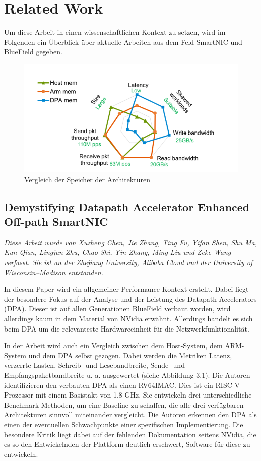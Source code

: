 \chapter{Related Work}
Um diese Arbeit in einen wissenschaftlichen Kontext zu setzen, wird im Folgenden ein Überblick über aktuelle Arbeiten aus dem Feld SmartNIC und BlueField gegeben.
\begin{figure}
    \centering
    \includegraphics[width=0.7\linewidth]{images/DPARam.png}
    \caption{Vergleich der Speicher der Architekturen \cite{chen2024demystifying}}
    \label{fig:enter-label}
\end{figure}
\section{Demystifying Datapath Accelerator Enhanced Off-path SmartNIC}
\textit{Diese Arbeit wurde von Xuzheng Chen, Jie Zhang, Ting Fu, Yifan Shen, Shu Ma, Kun Qian, Lingjun Zhu, Chao Shi, Yin Zhang, Ming Liu und Zeke Wang verfasst. Sie ist an der Zhejiang University, Alibaba Cloud und der University of Wisconsin–Madison entstanden.}

In diesem Paper wird ein allgemeiner Performance-Kontext erstellt. Dabei liegt der besondere Fokus auf der Analyse und der Leistung des Datapath Accelerators (DPA). Dieser ist auf allen Generationen BlueField verbaut worden, wird allerdings kaum in dem Material von NVidia erwähnt. Allerdings handelt es sich beim DPA um die relevanteste Hardwareeinheit für die Netzwerkfunktionalität. 

In der Arbeit wird auch ein Vergleich zwischen dem Host-System, dem ARM-System und dem DPA selbst gezogen. Dabei werden die Metriken Latenz, verzerrte Lasten, Schreib- und Lesebandbreite, Sende- und Empfangspaketbandbreite u. a. ausgewertet (siehe Abbildung 3.1). Die Autoren identifizieren den verbauten DPA als einen RV64IMAC. Dies ist ein RISC-V-Prozessor mit einem Basistakt von 1.8 GHz. Sie entwickeln drei unterschiedliche Benchmark-Methoden, um eine Baseline zu schaffen, die alle drei verfügbaren Architekturen sinnvoll miteinander vergleicht. Die Autoren erkennen den DPA als einen der eventuellen Schwachpunkte einer spezifischen Implementierung. Die besondere Kritik liegt dabei auf der fehlenden Dokumentation seitens NVidia, die es so den Entwickelnden der Plattform deutlich erschwert, Software für diese zu entwickeln.

